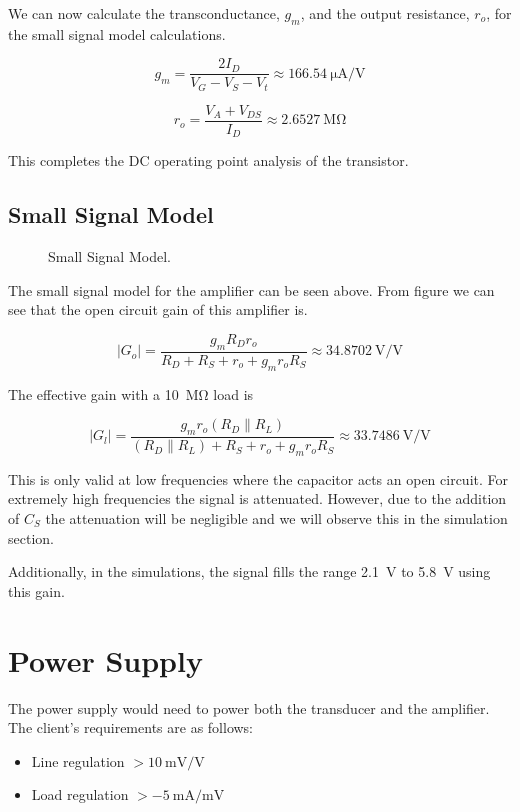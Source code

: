 \documentclass[journal]{IEEEtran}
\begin{document}
We can now calculate the transconductance, $g_m$, and the output resistance, $r_o$, for the small signal model calculations.

$$ g_m = \frac{2 I_D}{V_G - V_S - V_t} \approx \SI{166.54}{\micro\ampere\per\volt} $$

$$ r_o = \frac{V_A + V_{DS}}{I_D} \approx \SI{2.6527}{\mega\ohm} $$

This completes the DC operating point analysis of the transistor.

\subsection{Small Signal Model}

\begin{figure}[H]
	\centering
	
	\caption{Small Signal Model.}
	\label{ss}
\end{figure}

The small signal model for the amplifier can be seen above. From figure we can see that the open circuit gain of this amplifier is.

$$ |G_o| = \frac{g_m R_D r_o}{R_D + R_S + r_o + g_m r_o R_S} \approx \SI{34.8702}{\volt\per\volt}$$

The effective gain with a \SI{10}{\mega\ohm} load is

$$ |G_l| = \frac{g_m r_o \left( R_D \mathbin{\|} R_L \right)}{\left( R_D \mathbin{\|} R_L \right) + R_S + r_o + g_m r_o R_S} \approx \SI{33.7486}{\volt\per\volt} $$

This is only valid at low frequencies where the capacitor acts an open circuit. For extremely high frequencies the signal is attenuated. However, due to the addition of $C_S$ the attenuation will be negligible and we will observe this in the simulation section.

Additionally, in the simulations, the signal fills the range \SI{2.1}{\volt} to \SI{5.8}{\volt} using this gain.

\section{Power Supply}
The power supply would need to power both the transducer and the amplifier. The client's requirements are as follows:
\begin{itemize}
\item Line regulation $> \SI[per-mode=symbol]{10}{\milli\volt\per\volt}$
\item Load regulation $> \SI[per-mode=symbol]{-5}{\milli\ampere\per\milli\volt}$
\end{itemize}
\end{document}
